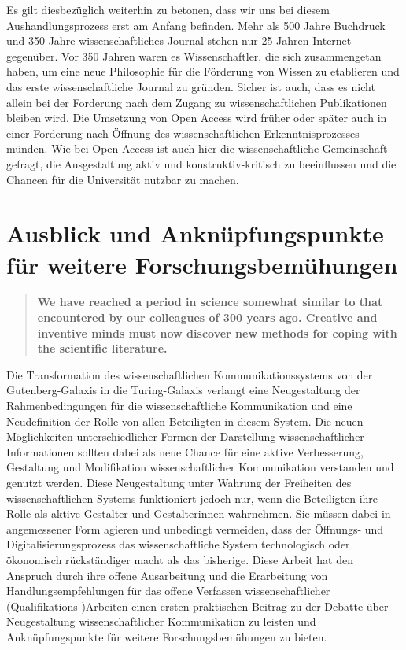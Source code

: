 Es gilt diesbezüglich weiterhin zu betonen, dass wir uns bei diesem Aushandlungsprozess erst am Anfang befinden. Mehr als 500 Jahre Buchdruck und 350 Jahre wissenschaftliches Journal stehen nur 25 Jahren Internet gegenüber. Vor 350 Jahren waren es Wissenschaftler, die sich zusammengetan haben, um eine neue Philosophie für die Förderung von Wissen zu etablieren und das erste wissenschaftliche Journal zu gründen. Sicher ist auch, dass es nicht allein bei der Forderung nach dem Zugang zu wissenschaftlichen Publikationen bleiben wird. Die Umsetzung von Open Access wird früher oder später auch in einer Forderung nach Öffnung des wissenschaftlichen Erkenntnisprozesses münden. Wie bei Open Access ist auch hier die wissenschaftliche Gemeinschaft gefragt, die Ausgestaltung aktiv und konstruktiv-kritisch zu beeinflussen und die Chancen für die Universität nutzbar zu machen.

\section{Ausblick und Anknüpfungspunkte für weitere Forschungsbemühungen}

\begin{quote}
\textbf{We have reached a period in science somewhat similar to that encountered by our colleagues of 300 years ago. Creative and inventive minds must now discover new methods for coping with the scientific literature.}
\end{quote} \cite[:229]{Porter_1964}

Die Transformation des wissenschaftlichen Kommunikationssystems von der Gutenberg-Galaxis in die Turing-Galaxis verlangt eine Neugestaltung der Rahmenbedingungen für die wissenschaftliche Kommunikation und eine Neudefinition der Rolle von allen Beteiligten in diesem System. Die neuen Möglichkeiten unterschiedlicher Formen der Darstellung wissenschaftlicher Informationen sollten dabei als neue Chance für eine aktive Verbesserung, Gestaltung und Modifikation wissenschaftlicher Kommunikation verstanden und genutzt werden. Diese Neugestaltung unter Wahrung der Freiheiten des wissenschaftlichen Systems funktioniert jedoch nur, wenn die Beteiligten ihre Rolle als aktive Gestalter und Gestalterinnen wahrnehmen. Sie müssen dabei in angemessener Form agieren und unbedingt vermeiden, dass der Öffnungs- und Digitalisierungsprozess das wissenschaftliche System technologisch oder ökonomisch rückständiger macht als das bisherige. Diese Arbeit hat den Anspruch durch ihre offene Ausarbeitung und die Erarbeitung von Handlungsempfehlungen für das offene Verfassen wissenschaftlicher (Qualifikations-)Arbeiten einen ersten praktischen Beitrag zu der Debatte über Neugestaltung wissenschaftlicher Kommunikation zu leisten und Anknüpfungspunkte für weitere Forschungsbemühungen zu bieten.

